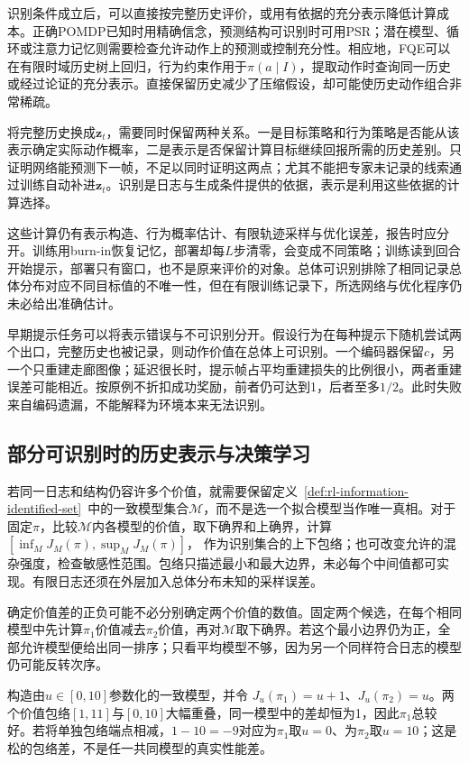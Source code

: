 识别条件成立后，可以直接按完整历史评价，或用有依据的充分表示降低计算成本。正确POMDP已知时用精确信念，预测结构可识别时可用PSR；潜在模型、循环或注意力记忆则需要检查允许动作上的预测或控制充分性。相应地，FQE可以在有限时域历史树上回归，行为约束作用于$\pi(a\mid I)$，提取动作时查询同一历史或经过论证的充分表示。直接保留历史减少了压缩假设，却可能使历史动作组合非常稀疏。

将完整历史换成$\bm z_t$，需要同时保留两种关系。一是目标策略和行为策略是否能从该表示确定实际动作概率，二是表示是否保留计算目标继续回报所需的历史差别。只证明网络能预测下一帧，不足以同时证明这两点；尤其不能把专家未记录的线索通过训练自动补进$\bm z_t$。识别是日志与生成条件提供的依据，表示是利用这些依据的计算选择。

这些计算仍有表示构造、行为概率估计、有限轨迹采样与优化误差，报告时应分开。训练用burn-in恢复记忆，部署却每$L$步清零，会变成不同策略；训练读到回合开始提示，部署只有窗口，也不是原来评价的对象。总体可识别排除了相同记录总体分布对应不同目标值的不唯一性，但在有限训练记录下，所选网络与优化程序仍未必给出准确估计。

早期提示任务可以将表示错误与不可识别分开。假设行为在每种提示下随机尝试两个出口，完整历史也被记录，则动作价值在总体上可识别。一个编码器保留$c$，另一个只重建走廊图像；延迟很长时，提示帧占平均重建损失的比例很小，两者重建误差可能相近。按原例不折扣成功奖励，前者仍可达到1，后者至多$1/2$。此时失败来自编码遗漏，不能解释为环境本来无法识别。

\subsection{部分可识别时的历史表示与决策学习}
\label{sec:rl-information-partial-identification}

若同一日志和结构仍容许多个价值，就需要保留定义~\ref{def:rl-information-identified-set}~中的一致模型集合$\mathcal M$，而不是选一个拟合模型当作唯一真相。对于固定$\pi$，比较$\mathcal M$内各模型的价值，取下确界和上确界，计算
$[\inf_MJ_M(\pi),\sup_MJ_M(\pi)]$，
作为识别集合的上下包络；也可改变允许的混杂强度，检查敏感性范围。包络只描述最小和最大边界，未必每个中间值都可实现。有限日志还须在外层加入总体分布未知的采样误差。

确定价值差的正负可能不必分别确定两个价值的数值。固定两个候选，在每个相同模型中先计算$\pi_1$价值减去$\pi_2$价值，再对$\mathcal M$取下确界。若这个最小边界仍为正，全部允许模型便给出同一排序；只看平均模型不够，因为另一个同样符合日志的模型仍可能反转次序。

\begin{example}
  \label{ex:rl-information-partial-order}
  构造由$u\in[0,10]$参数化的一致模型，并令
  $J_u(\pi_1)=u+1$、$J_u(\pi_2)=u$。两个价值包络$[1,11]$与$[0,10]$大幅重叠，同一模型中的差却恒为1，因此$\pi_1$总较好。若将单独包络端点相减，$1-10=-9$对应为$\pi_1$取$u=0$、为$\pi_2$取$u=10$；这是松的包络差，不是任一共同模型的真实性能差。
\end{example}

